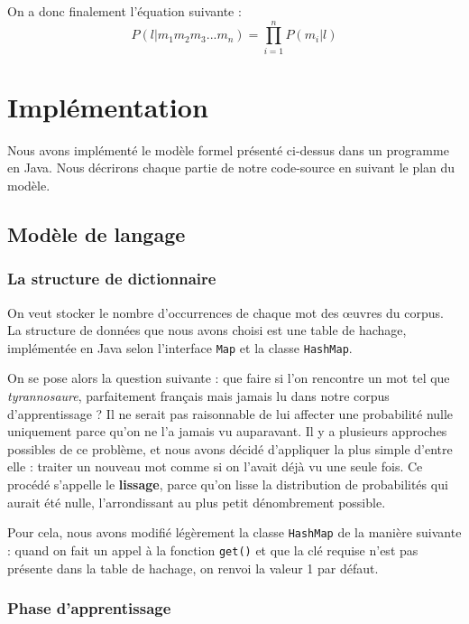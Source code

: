 \documentclass[10pt,a4paper]{article}
\begin{document}
 On a donc finalement l'équation suivante : 
 \begin{equation}
P(l|m_1m_2m_3...m_n) = \prod_{i=1}^nP(m_i|l)
 \end{equation}

\section{Implémentation}

Nous avons implémenté le modèle formel présenté ci-dessus dans un programme en Java. Nous décrirons chaque partie de notre code-source en suivant le plan du modèle.

\subsection{Modèle de langage}
\subsubsection{La structure de dictionnaire}
\label{tyrannosaure}

On veut stocker le nombre d'occurrences de chaque mot des œuvres du corpus. La structure de données que nous avons choisi est une table de hachage, implémentée en Java selon l'interface \verb!Map! et la classe \verb!HashMap!.

On se pose alors la question suivante : que faire si l'on rencontre un mot tel que \textit{tyrannosaure}, parfaitement français mais jamais lu dans notre corpus d'apprentissage ? Il ne serait pas raisonnable de lui affecter une probabilité nulle uniquement parce qu'on ne l'a jamais vu auparavant. Il y a plusieurs approches possibles de ce problème, et nous avons décidé d'appliquer la plus simple d'entre elle : traiter un nouveau mot comme si on l'avait déjà vu une seule fois. Ce procédé s'appelle le \textbf{lissage}, parce qu'on lisse la distribution de probabilités qui aurait été nulle, l'arrondissant au plus petit dénombrement possible.

Pour cela, nous avons modifié légèrement la classe \verb!HashMap! de la manière suivante : quand on fait un appel à la fonction \verb!get()! et que la clé requise n'est pas présente dans la table de hachage, on renvoi la valeur 1 par défaut.



\subsubsection{Phase d'apprentissage}
\end{document}
